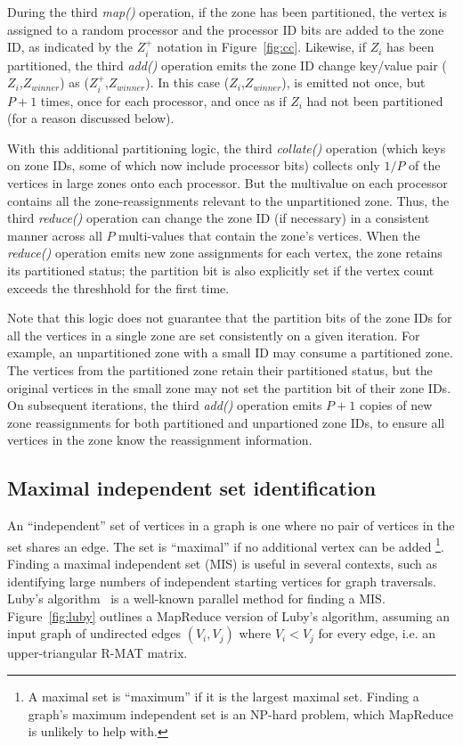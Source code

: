 During the third {\it map()} operation, if the zone has been
partitioned, the vertex is assigned to a random processor and the
processor ID bits are added to the zone ID, as indicated by the
$Z_i^+$ notation in Figure~\ref{fig:cc}.  Likewise, if $Z_i$ has been
partitioned, the third {\it add()} operation emits the zone ID change
key/value pair ($Z_i$,$Z_{winner}$) as ($Z_i^+$,$Z_{winner}$).  In
this case ($Z_i$,$Z_{winner}$), is emitted not once, but $P+1$ times,
once for each processor, and once as if $Z_i$ had not been partitioned
(for a reason discussed below).

With this additional partitioning logic, the third {\it
collate()} operation (which keys on zone IDs, some of which now
include processor bits) collects only $1/P$ of the
vertices in large zones onto each processor.  But the multivalue on
each processor contains all the zone-reassignments relevant to the
unpartitioned zone.  Thus, the third {\it reduce()} operation can
change the zone ID (if necessary) in a consistent manner across all
$P$ multi-values that contain the zone's vertices.  When the {\it
reduce()} operation emits new zone assignments for each vertex, the
zone retains its partitioned status; the partition bit is also
explicitly set if the vertex count exceeds the threshhold for the
first time.

Note that this logic does not guarantee that the partition bits of the
zone IDs for all the vertices in a single zone are set
consistently on a given iteration.  For example, an unpartitioned zone
with a small ID may consume a partitioned zone.  The vertices from the
partitioned zone retain their partitioned status, but the
original vertices in the small zone may not set the partition bit of
their zone IDs.  On subsequent iterations, the third {\it add()}
operation emits $P+1$ copies of new zone reassignments for both
partitioned and unpartioned zone IDs, to ensure all vertices in the
zone know the reassignment information.

\subsection{Maximal independent set identification}

An ``independent'' set of vertices in a graph is one where no pair of
vertices in the set shares an edge.  The set is ``maximal'' if no
additional vertex can be added \footnote{A maximal set is ``maximum''
if it is the largest maximal set.  Finding a graph's maximum
independent set is an NP-hard problem, which MapReduce is unlikely to
help with.}.  Finding a maximal independent set (MIS) is useful in
several contexts, such as identifying large numbers of independent
starting vertices for graph traversals.  Luby's algorithm~\cite{Luby86}
is a well-known parallel method for finding a MIS.  Figure~\ref{fig:luby} 
outlines a MapReduce version of Luby's algorithm,
assuming an input graph of undirected edges $(V_i,V_j)$ where $V_i <
V_j$ for every edge, i.e. an upper-triangular R-MAT matrix.

